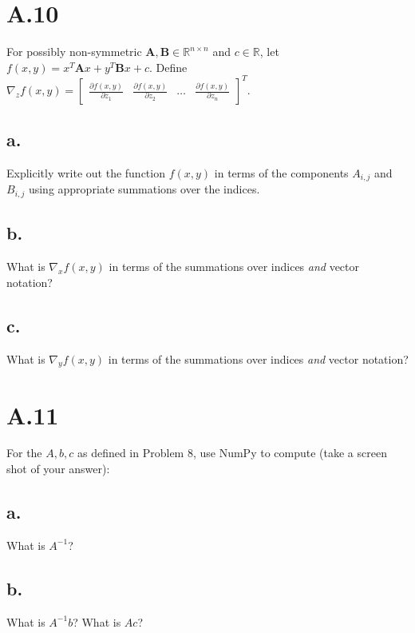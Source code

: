 \documentclass{article}
\newcommand{\field}[1]{\mathbb{#1}}
\newcommand{\1}{\mathbf{1}}
\newcommand{\R}{\field{R}} %
\newcommand{\mat}[1]{\boldsymbol{#1}} %
\begin{document}
\section*{A.10}
{\Large 

For possibly non-symmetric $\mat{A}, \mat{B} \in \R^{n \times n}$ and $c \in \R$, let $f(x, y) = x^T \mat{A} x + y^T \mat{B} x + c$. Define $\nabla_z f(x,y) = \begin{bmatrix} \frac{\partial f(x,y)}{\partial z_1} & \frac{\partial f(x,y)}{\partial z_2} & \dots & \frac{\partial f(x,y)}{\partial z_n} \end{bmatrix}^T$.  

\subsection*{a.}
Explicitly write out the function $f(x, y)$ in terms of the components $A_{i,j}$ and $B_{i,j}$ using appropriate summations over the indices.

\subsection*{b.}
What is $\nabla_x f(x,y)$ in terms of the summations over indices \emph{and} vector notation?

\subsection*{c.}
What is $\nabla_y f(x,y)$ in terms of the summations over indices \emph{and} vector notation?

}

\section*{A.11}
{\Large 

For the $A, b, c$ as defined in Problem 8, use
  NumPy to compute (take a screen shot of your answer):

\subsection*{a.}
What is $A^{-1}$?

\subsection*{b.}
What is $A^{-1}b$? What is $Ac$?

}
\end{document}

